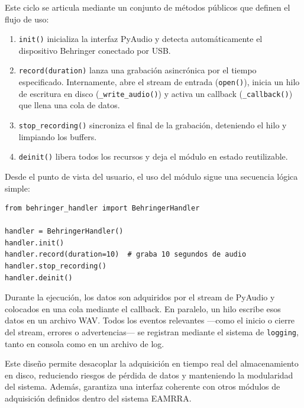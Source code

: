 Este ciclo se articula mediante un conjunto de métodos públicos que definen el flujo de uso:

\begin{enumerate}
    \item \texttt{init()} inicializa la interfaz PyAudio y detecta automáticamente el dispositivo Behringer conectado por USB.
    \item \texttt{record(duration)} lanza una grabación asincrónica por el tiempo especificado. Internamente, abre el stream de entrada (\texttt{open()}), inicia un hilo de escritura en disco (\texttt{\_write\_audio()}) y activa un callback (\texttt{\_callback()}) que llena una cola de datos.
    \item \texttt{stop\_recording()} sincroniza el final de la grabación, deteniendo el hilo y limpiando los buffers.
    \item \texttt{deinit()} libera todos los recursos y deja el módulo en estado reutilizable.
\end{enumerate}

Desde el punto de vista del usuario, el uso del módulo sigue una secuencia lógica simple:

\begin{verbatim}
from behringer_handler import BehringerHandler

handler = BehringerHandler()
handler.init()
handler.record(duration=10)  # graba 10 segundos de audio
handler.stop_recording()
handler.deinit()
\end{verbatim}

Durante la ejecución, los datos son adquiridos por el stream de PyAudio y colocados en una cola mediante el callback. En paralelo, un hilo escribe esos datos en un archivo WAV. Todos los eventos relevantes —como el inicio o cierre del stream, errores o advertencias— se registran mediante el sistema de \texttt{logging}, tanto en consola como en un archivo de log.

Este diseño permite desacoplar la adquisición en tiempo real del almacenamiento en disco, reduciendo riesgos de pérdida de datos y manteniendo la modularidad del sistema. Además, garantiza una interfaz coherente con otros módulos de adquisición definidos dentro del sistema EAMRRA.

